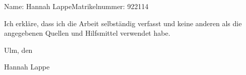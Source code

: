 \documentclass[a4paper,
fontsize=12pt,
headsepline,           %
oneside,               %
number=noenddot,       %
bibliography=totoc,    %
BCOR=15mm              %
]{scrbook}
\newcommand{\fullname}{Hannah Lappe}
\newcommand{\matnr}{922114}
\begin{document}

\tableofcontents

\mainmatter







\appendix



\backmatter

\printbibliography

\clearpage
\thispagestyle{empty}

Name: \fullname \hfill Matrikelnummer: \matnr \vspace{2cm}


Ich erkläre, dass ich die Arbeit selbständig verfasst und keine anderen als die angegebenen Quellen und Hilfsmittel verwendet habe.\vspace{2cm}

Ulm, den \dotfill

\hspace{10cm} {\footnotesize \fullname}
\end{document}
